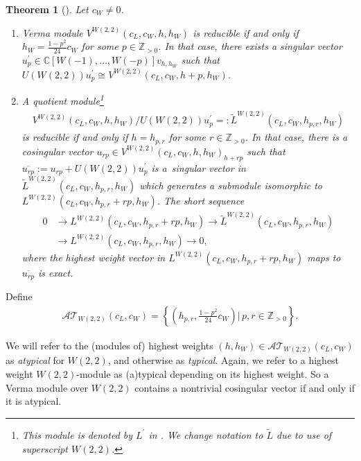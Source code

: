 \documentclass[11pt]{article}
\numberwithin{equation}{section}
\newtheorem{Theorem}{Theorem}[section]
\newcommand{\N}{{\mathbb Z}_{> 0} }
\newcommand{\C}{\mathbb C}
\begin{document}
\begin{Theorem}[{\cite{JZ, R-JMP}}]\label{W-struktura}Let $c_{W}\neq0$.
\begin{enumerate}\itemsep=0pt
\item[$(i)$]Verma module $V^{W(2,2)}(c_{L},c_{W},h,h_{W}) $ is reducible if and only if $h_{W}=\frac{1-p^{2}}{24}c_{W}$ for some $p\in \N$. In that case, there exists a singular vector $u_p^{\prime}\in \C [ W(-1) ,\ldots,W(-p)]v_{h,h_W} $ such that $U(W(2,2)) u_p^{\prime} \cong V^{W(2,2)}(c_{L},c_{W},h+p,h_{W}) $.

\item[$(ii)$]A quotient module\footnote{This module is denoted by $L^{\prime}$ in \cite{JZ,R-JMP}. We
change notation to $\widetilde{L}$ due to use of superscript $W(2,2)$.}
\begin{gather*}V^{W(2,2)}(c_{L},c_{W},h,h_{W}) / U(W(2,2)) u_p^{\prime} =: \widetilde{L}^{W(2,2)}( c_{L},c_{W},h_{p,r},h_{W})
\end{gather*}
is reducible if and only if $ h = h_{p,r} $ for some $r\in\N$. In that case, there is a cosingular vector $%
u_{rp}\in V^{W(2,2)}(c_{L},c_{W},h,h_{W}) _{h+rp}$ such that $\overline{u_{rp}} := u_{rp} + U(W(2,2)) u_p^{\prime}$ is a~singular vector in $\widetilde{L}^{W(2,2)}( c_{L},c_{W},h_{p,r},h_{W})$ which generates a submodule isomorphic to $L^{W(2,2)}( c_{L},c_{W},h_{p,r}+rp,h_{W})$. The short sequence
\begin{align}
0 &\rightarrow L^{W(2,2)}(c_{L},c_{W},h_{p,r}+rp,h_{W}) \rightarrow\widetilde{L}^{W(2,2)} ( c_{L},c_{W},h_{p,r},h_{W} ) \nonumber \\
&\rightarrow L^{W(2,2)} ( c_{L},c_{W},h_{p,r},h_{W} ) \rightarrow 0, \label{seq}
\end{align}
where the highest weight vector in $L^{W(2,2)}(c_{L},c_{W},h_{p,r}+rp,h_{W})$ maps to $\overline{u_{rp}}$ is exact.
\end{enumerate}
\end{Theorem}

Def\/ine
\begin{gather*}
{\mathcal {AT} }_{W(2,2) } ( c_L, c_{W} ) = \left\{ \left(h_{p,r}, \frac{1-p^2}{24}c_W\right) |\, p,r \in \N \right\}.
\end{gather*}
\begin{Remark}
We will refer to the (modules of) highest weights $(h, h_W) \in {\mathcal {AT} }_{W(2,2) } ( c_L, c_{W} ) $ as \textit{atypical} for $W(2,2)$, and otherwise as \textit{typical}. Again, we refer to a highest weight $W(2,2)$-module as (a)typical depending on its highest weight. So a Verma module over $W(2,2)$ contains a nontrivial cosingular vector if and only if it is atypical.
\end{Remark}
\end{document}
